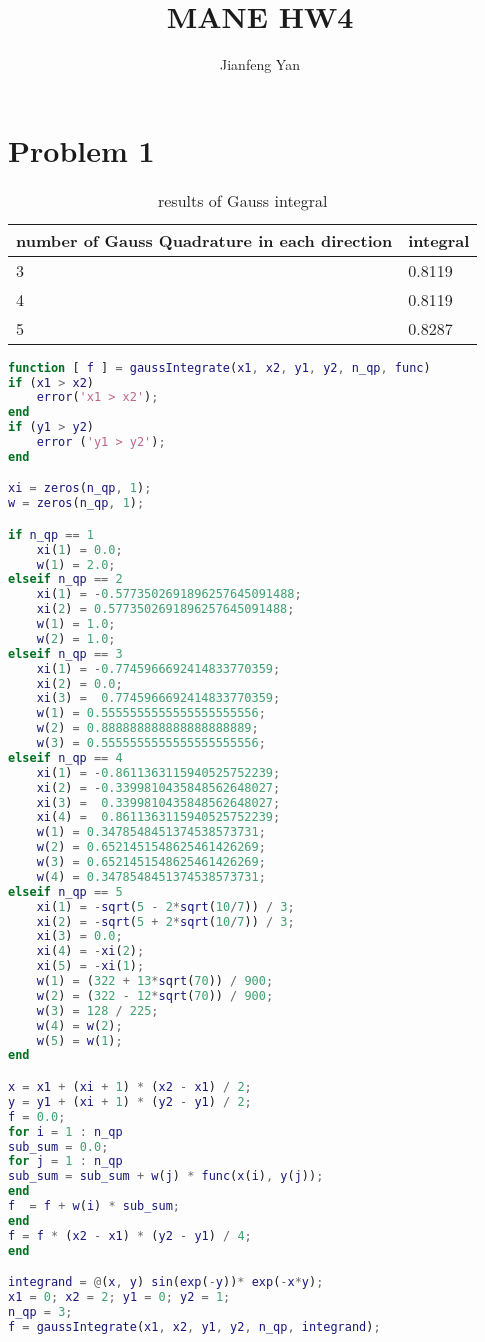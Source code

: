 \documentclass[a4paper]{article}
\title{MANE HW4}
\author{Jianfeng Yan}
\begin{document}
\maketitle
\section*{Problem 1}
\begin{table}[h]
  \begin{center}
    \caption[]{results of Gauss integral} \label{tb:conv_his}
    \begin{tabular}{p{}p{}}
      \hline
      number of Gauss Quadrature in each direction&      integral     \\
      \hline
      3 &          0.8119  \\
      4&          0.8119\\
      5&          0.8287\\

      \hline
    \end{tabular}
  \end{center}
\end{table}

\begin{lstlisting}[language=Matlab]
function [ f ] = gaussIntegrate(x1, x2, y1, y2, n_qp, func)
if (x1 > x2)
    error('x1 > x2');
end
if (y1 > y2)
    error ('y1 > y2');
end

xi = zeros(n_qp, 1);
w = zeros(n_qp, 1);

if n_qp == 1
    xi(1) = 0.0;
    w(1) = 2.0;
elseif n_qp == 2
    xi(1) = -0.5773502691896257645091488;
    xi(2) = 0.5773502691896257645091488;
    w(1) = 1.0;
    w(2) = 1.0;
elseif n_qp == 3
    xi(1) = -0.7745966692414833770359;
    xi(2) = 0.0;
    xi(3) =  0.7745966692414833770359;
    w(1) = 0.5555555555555555555556;
    w(2) = 0.888888888888888888889;
    w(3) = 0.5555555555555555555556;
elseif n_qp == 4
    xi(1) = -0.8611363115940525752239;
    xi(2) = -0.3399810435848562648027;
    xi(3) =  0.3399810435848562648027;
    xi(4) =  0.8611363115940525752239;
    w(1) = 0.3478548451374538573731;
    w(2) = 0.6521451548625461426269;
    w(3) = 0.6521451548625461426269;
    w(4) = 0.3478548451374538573731;
elseif n_qp == 5
    xi(1) = -sqrt(5 - 2*sqrt(10/7)) / 3;
    xi(2) = -sqrt(5 + 2*sqrt(10/7)) / 3;
    xi(3) = 0.0;
    xi(4) = -xi(2);
    xi(5) = -xi(1);
    w(1) = (322 + 13*sqrt(70)) / 900;
    w(2) = (322 - 12*sqrt(70)) / 900;
    w(3) = 128 / 225;
    w(4) = w(2);
    w(5) = w(1);
end

x = x1 + (xi + 1) * (x2 - x1) / 2;
y = y1 + (xi + 1) * (y2 - y1) / 2;
f = 0.0;
for i = 1 : n_qp
sub_sum = 0.0;
for j = 1 : n_qp
sub_sum = sub_sum + w(j) * func(x(i), y(j));
end
f  = f + w(i) * sub_sum;
end
f = f * (x2 - x1) * (y2 - y1) / 4;
end

integrand = @(x, y) sin(exp(-y))* exp(-x*y);
x1 = 0; x2 = 2; y1 = 0; y2 = 1;
n_qp = 3;
f = gaussIntegrate(x1, x2, y1, y2, n_qp, integrand);
\end{lstlisting}
\end{document}
